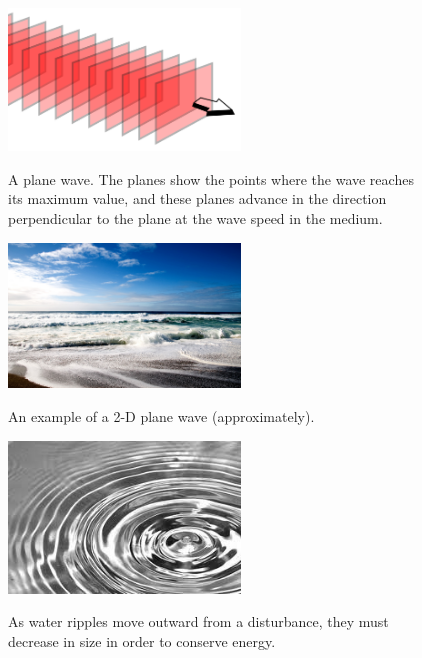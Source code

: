 \documentclass[12pt]{article}
\begin{document}
\begin{figure}[thb]
\begin{center}
{\includegraphics[width=0.55\textwidth]{figs/planewave.png}}
\end{center}
\caption{\label{fig:planewave}A plane wave.  The planes show the points where the wave reaches its maximum value, and these planes advance in the direction perpendicular to the plane at the wave speed in the medium. }
\end{figure}

\begin{figure}[thb]
\begin{center}
{\includegraphics[width=0.55\textwidth]{figs/beach.jpg}}
\end{center}
\caption{\label{fig:beachwave} An example of a 2-D plane wave (approximately).}
\end{figure}

\begin{figure}[thb]
\begin{center}
{\includegraphics[width=0.55\textwidth]{figs/ripples.jpg}}
\end{center}
\caption{\label{fig:ripples} As water ripples move outward from a disturbance, they must decrease in size in order to conserve energy.}
\end{figure}
\end{document}
